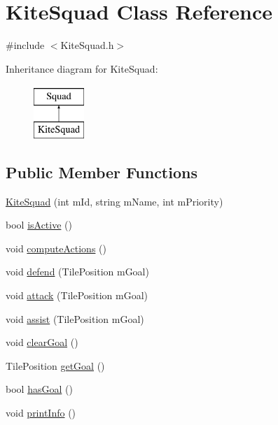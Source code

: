 \hypertarget{class_kite_squad}{\section{Kite\-Squad Class Reference}
\label{class_kite_squad}
}


{\ttfamily \#include $<$Kite\-Squad.\-h$>$}

Inheritance diagram for Kite\-Squad\-:\begin{figure}[H]
\begin{center}
\leavevmode
\includegraphics[height=2.000000cm]{class_kite_squad}
\end{center}
\end{figure}
\subsection*{Public Member Functions}
\begin{DoxyCompactItemize}
\item 
\hyperlink{class_kite_squad_a8986c7e37d466183bb9acbbc3f1833c4}{Kite\-Squad} (int m\-Id, string m\-Name, int m\-Priority)
\item 
bool \hyperlink{class_kite_squad_a5ad4642151131cf0e8314e2a7681b7e7}{is\-Active} ()
\item 
void \hyperlink{class_kite_squad_a698aa209bf16b58892a397ec296d4815}{compute\-Actions} ()
\item 
void \hyperlink{class_kite_squad_a2aa62831b44a56d96c3ab51d60df4a69}{defend} (Tile\-Position m\-Goal)
\item 
void \hyperlink{class_kite_squad_a4a892e3d48cece93652c8c9466f399d8}{attack} (Tile\-Position m\-Goal)
\item 
void \hyperlink{class_kite_squad_ab30b684272bf68ee267e07960f669508}{assist} (Tile\-Position m\-Goal)
\item 
void \hyperlink{class_kite_squad_a48ffdfb34672a313572daf71e3a29cf1}{clear\-Goal} ()
\item 
Tile\-Position \hyperlink{class_kite_squad_a64cb8b009ddb33ac2d3ddacc02644bce}{get\-Goal} ()
\item 
bool \hyperlink{class_kite_squad_adc93a87ea13615e3aa75d06ae80d5a2b}{has\-Goal} ()
\item 
void \hyperlink{class_kite_squad_a6281202a63de91a93d33f868a08e128f}{print\-Info} ()
\end{DoxyCompactItemize}

